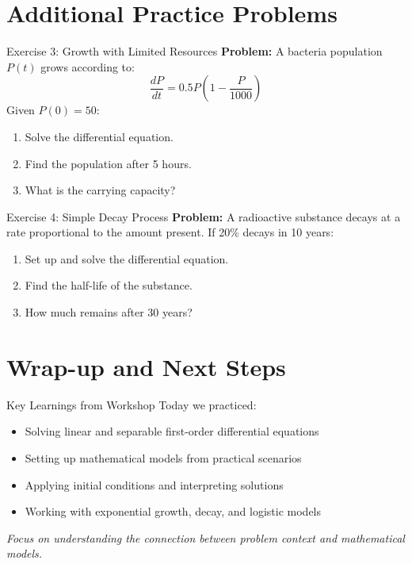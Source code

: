 \documentclass[10pt,aspectratio=169]{beamer}
\newcommand{\concept}[1]{\textbf{#1}}
\newcommand{\formula}[1]{\textit{#1}}
\newcommand{\emphasis}[1]{\textit{#1}}
\begin{document}
\section{Additional Practice Problems}
\begin{frame}{Exercise 3: Growth with Limited Resources}
    \concept{Problem:} A bacteria population $P(t)$ grows according to:
    \formula{\[ \frac{dP}{dt} = 0.5P\left(1-\frac{P}{1000}\right) \]}
    Given $P(0) = 50$:
    \begin{enumerate}
        \item Solve the differential equation.
        \item Find the population after 5 hours.
        \item What is the carrying capacity?
    \end{enumerate}
\end{frame}

\begin{frame}{Exercise 4: Simple Decay Process}
    \concept{Problem:} A radioactive substance decays at a rate proportional to the amount present. If 20\% decays in 10 years:
    \begin{enumerate}
        \item Set up and solve the differential equation.
        \item Find the half-life of the substance.
        \item How much remains after 30 years?
    \end{enumerate}
\end{frame}

\section{Wrap-up and Next Steps}
\begin{frame}{Key Learnings from Workshop}
    Today we practiced:
    \begin{itemize}
        \item Solving linear and separable first-order differential equations
        \item Setting up mathematical models from practical scenarios
        \item Applying initial conditions and interpreting solutions
        \item Working with exponential growth, decay, and logistic models
    \end{itemize}
    \emphasis{Focus on understanding the connection between problem context and mathematical models.}
\end{frame}
\end{document}
